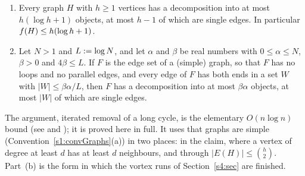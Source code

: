 \begin{fact}\label{s1:factEG0}
\begin{enumerate}
\item[(a)] Every graph $H$ with $h\ge1$ vertices has a decomposition into at
most $h(\log h+1)$ objects, at most $h-1$ of which are single edges. In
particular $f(H)\le h(\log h+1)$.
\item[(b)] Let $N>1$ and $L\mathrel{:=}\log N$, and let $\alpha$ and $\beta$ be real
numbers with $0\le\alpha\le N$, $\beta>0$ and $4\beta\le L$. If $F$ is the
edge set of a (simple) graph, so that $F$ has no loops and no parallel edges,
and every edge of $F$ has both ends in a set $W$ with $|W|\le\beta\alpha/L$,
then $F$ has a decomposition into at most $\beta\alpha$ objects, at most $|W|$
of which are single edges.
\end{enumerate}
The argument, iterated removal of a long cycle, is the elementary
$O(n\log n)$ bound (see \cite{EG66} and \cite{BM}); it is proved here in full. It uses that graphs are
simple (Convention~\ref{s1:convGraphs}(a)) in two places: in the claim, where a
vertex of degree at least $d$ has at least $d$ neighbours, and through
$|E(H)|\le\binom h2$.
Part~(b) is the form in which the vortex runs of Section~\ref{s4:sec} are
finished.
\end{fact}
